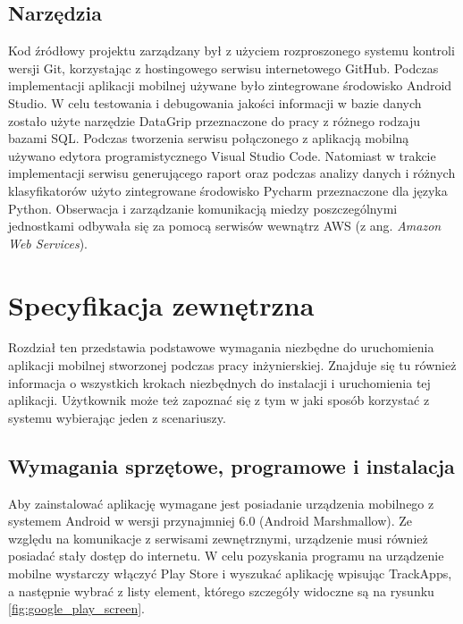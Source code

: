 \documentclass[a4paper,twoside,12pt]{book}
\newcommand{\obcy}[1]{\emph{#1}}
\newcommand{\ang}[1]{{\selectlanguage{british}\obcy{#1}}}
\begin{document}
\section{Narzędzia}
Kod źródłowy projektu zarządzany był z użyciem rozproszonego systemu kontroli wersji Git, korzystając z hostingowego serwisu internetowego GitHub. Podczas implementacji aplikacji mobilnej używane było zintegrowane środowisko Android Studio. W celu testowania i debugowania jakości informacji w bazie danych zostało użyte narzędzie DataGrip przeznaczone do pracy z różnego rodzaju bazami SQL. Podczas tworzenia serwisu połączonego z aplikacją mobilną używano edytora programistycznego Visual Studio Code. Natomiast w trakcie implementacji serwisu generującego raport oraz podczas analizy danych i różnych klasyfikatorów użyto zintegrowane środowisko Pycharm przeznaczone dla języka Python. Obserwacja i zarządzanie komunikacją miedzy poszczególnymi jednostkami odbywała się za pomocą serwisów wewnątrz AWS (z ang. \ang{Amazon Web Services}).


\chapter{Specyfikacja zewnętrzna}
\label{chap:zewn}
Rozdział ten przedstawia podstawowe wymagania niezbędne do uruchomienia aplikacji mobilnej stworzonej podczas pracy inżynierskiej. Znajduje się tu również informacja o wszystkich krokach niezbędnych do instalacji i uruchomienia tej aplikacji. Użytkownik może też zapoznać się z tym w jaki sposób korzystać z systemu wybierając jeden z scenariuszy. 
\section{Wymagania sprzętowe, programowe i instalacja}

Aby zainstalować aplikację wymagane jest posiadanie urządzenia mobilnego z systemem Android w wersji przynajmniej 6.0 (Android Marshmallow). Ze względu na komunikacje z serwisami zewnętrznymi, urządzenie musi również posiadać stały dostęp do internetu. W celu pozyskania programu na urządzenie mobilne wystarczy włączyć Play Store i wyszukać aplikację wpisując TrackApps, a następnie wybrać z listy element, którego szczegóły widoczne są na rysunku
\ref{fig:google_play_screen}.
\end{document}

